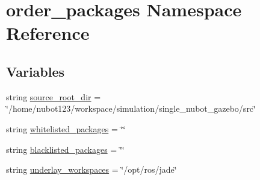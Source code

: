 \hypertarget{namespaceorder__packages}{\section{order\-\_\-packages Namespace Reference}
\label{namespaceorder__packages}
}
\subsection*{Variables}
\begin{DoxyCompactItemize}
\item 
string \hyperlink{namespaceorder__packages_aff4fd297841de7fbddc2c0c33a6bab21}{source\-\_\-root\-\_\-dir} = \char`\"{}/home/nubot123/workspace/simulation/single\-\_\-nubot\-\_\-gazebo/src\char`\"{}
\item 
string \hyperlink{namespaceorder__packages_a84450a73e77dbf3689293b97dcb697a4}{whitelisted\-\_\-packages} = \char`\"{}\char`\"{}
\item 
string \hyperlink{namespaceorder__packages_a29ea913f00c5a0e81d3c7688e7375507}{blacklisted\-\_\-packages} = \char`\"{}\char`\"{}
\item 
string \hyperlink{namespaceorder__packages_a11d102ff09fd2977b9075c4c722015d2}{underlay\-\_\-workspaces} = \char`\"{}/opt/ros/jade\char`\"{}
\end{DoxyCompactItemize}


